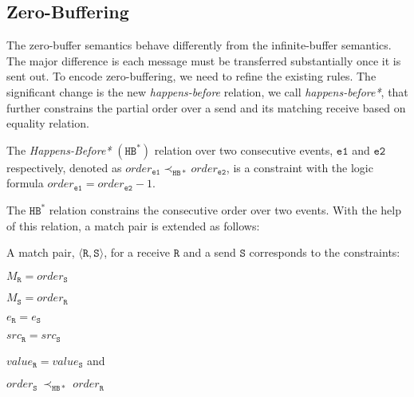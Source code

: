 





\subsection{Zero-Buffering}
The zero-buffer semantics behave differently from the infinite-buffer semantics. The major difference is each message must be transferred substantially once it is sent out. To encode zero-buffering, we need to refine the existing rules. The significant change is the new \emph{happens-before} relation, we call \textit{happens-before*}, that further constrains the partial order over a send and its matching receive based on equality relation. 

\begin{definition}
The \emph{Happens-Before*} $(\mathtt{HB^*})$ relation over two consecutive events, $\mathtt{e1}$ and $\mathtt{e2}$ respectively, denoted as
$\mathit{order}_\mathtt{e1} \mathrm{\prec_\mathtt{HB*}} \mathit{order}_\mathtt{e2}$, is a constraint with the logic formula $\mathit{order}_\mathtt{e1} =  \mathit{order}_\mathtt{e2} - 1$.
\label{def:hb*}
\end{definition}

The $\mathtt{HB^*}$ relation constrains the consecutive order over two events. With the help of this relation, a match pair is extended as follows: 

\begin{definition} \label{def:match*}
A match pair, $\langle\mathtt{R}, \mathtt{S}\rangle$, for a receive
$\mathtt{R}$ and a send $\mathtt{S}$ corresponds to the constraints:
\begin{compactenum}
\item $M_{\mathtt{R}} = \mathit{order}_{\mathtt{S}}$
\item $M_{\mathtt{S}} = \mathit{order}_{\mathtt{R}}$
\item $e_{\mathtt{R}} = e_{\mathtt{S}}$
\item $src_\mathtt{R} = src_\mathtt{S}$
\item $\mathit{value}_{\mathtt{R}} = \mathit{value}_{\mathtt{S}}$ and
\item $\mathit{order}_{\mathtt{S}}\ \mathrm{\prec_\mathtt{HB*}}\ \mathit{order}_{\mathtt{R}}$
\end{compactenum}
\end{definition}

